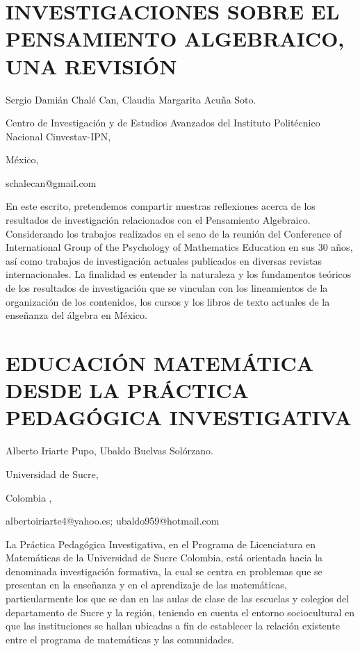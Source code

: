 \setcounter{section}{42}


\section{INVESTIGACIONES SOBRE EL PENSAMIENTO ALGEBRAICO, UNA REVISIÓN }

\begin{datos}

Sergio Damián Chalé Can, Claudia Margarita Acuña Soto.

Centro de Investigación y de Estudios Avanzados del Instituto Politécnico
Nacional Cinvestav-IPN,

México,

schalecan@gmail.com 

\end{datos}

En este escrito, pretendemos compartir nuestras reflexiones acerca
de los resultados de investigación relacionados con el Pensamiento
Algebraico. Considerando los trabajos realizados en el seno de la
reunión del Conference of International Group of the Psychology of
Mathematics Education en sus 30 años, así como trabajos de investigación
actuales publicados en diversas revistas internacionales. La finalidad
es entender la naturaleza y los fundamentos teóricos de los resultados
de investigación que se vinculan con los lineamientos de la organización
de los contenidos, los cursos y los libros de texto actuales de la
enseñanza del álgebra en México.


\section{EDUCACIÓN MATEMÁTICA DESDE LA PRÁCTICA PEDAGÓGICA INVESTIGATIVA}

\begin{datos}

Alberto Iriarte Pupo, Ubaldo Buelvas Solórzano.

Universidad de Sucre,

Colombia ,

albertoiriarte4@yahoo.es; ubaldo959@hotmail.com 

\end{datos}

La Práctica Pedagógica Investigativa, en el Programa de Licenciatura
en Matemáticas de la Universidad de Sucre Colombia, está orientada
hacia la denominada investigación formativa, la cual se centra en
problemas que se presentan en la enseñanza y en el aprendizaje de
las matemáticas, particularmente los que se dan en las aulas de clase
de las escuelas y colegios del departamento de Sucre y la región,
teniendo en cuenta el entorno sociocultural en que las instituciones
se hallan ubicadas a fin de establecer la relación existente entre
el programa de matemáticas y las comunidades. 


